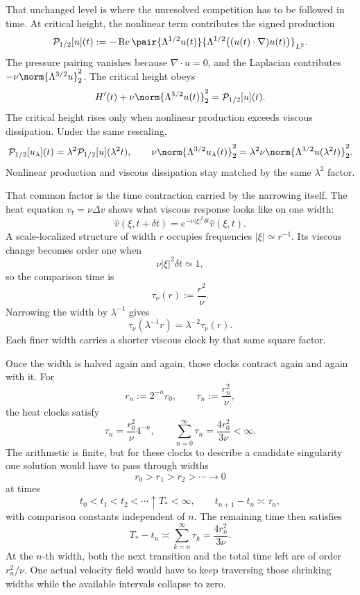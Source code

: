 
That unchanged level is where the unresolved competition has to be followed in time. At critical height, the nonlinear term contributes the signed production
\[
  \mathcal P_{1/2}[u](t)
  :=
  -\operatorname{Re}
  \pair
    {\Lambda^{1/2}u(t)}
    {\Lambda^{1/2}\bigl((u(t)\cdot\nabla)u(t)\bigr)}_{L^2}.
\]
The pressure pairing vanishes because \(\nabla\cdot u=0\), and the Laplacian contributes \(-\nu\norm{\Lambda^{3/2}u}_2^2\). The critical height obeys
\[
  H'(t)
  +
  \nu\norm{\Lambda^{3/2}u(t)}_2^2
  =
  \mathcal P_{1/2}[u](t).
\]
The critical height rises only when nonlinear production exceeds viscous dissipation. Under the same rescaling,
\[
  \mathcal P_{1/2}[u_\lambda](t)
  =
  \lambda^2\mathcal P_{1/2}[u](\lambda^2t),
  \qquad
  \nu\norm{\Lambda^{3/2}u_\lambda(t)}_2^2
  =
  \lambda^2\nu\norm{\Lambda^{3/2}u(\lambda^2t)}_2^2.
\]
Nonlinear production and viscous dissipation stay matched by the same \(\lambda^2\) factor.


That common factor is the time contraction carried by the narrowing itself. The heat equation \(v_t=\nu\Delta v\) shows what viscous response looks like on one width:
\[
  \widehat v(\xi,t+\delta t)
  =
  e^{-\nu|\xi|^2\delta t}\widehat v(\xi,t).
\]
A scale-localized structure of width \(r\) occupies frequencies \(|\xi|\simeq r^{-1}\). Its viscous change becomes order one when
\[
  \nu|\xi|^2\delta t\simeq1,
\]
so the comparison time is
\[
  \tau_\nu(r)
  :=
  \frac{r^2}{\nu}.
\]
Narrowing the width by \(\lambda^{-1}\) gives
\[
  \tau_\nu(\lambda^{-1}r)
  =
  \lambda^{-2}\tau_\nu(r).
\]
Each finer width carries a shorter viscous clock by that same square factor.


Once the width is halved again and again, those clocks contract again and again with it. For
\[
  r_n:=2^{-n}r_0,
  \qquad
  \tau_n:=\frac{r_n^2}{\nu},
\]
the heat clocks satisfy
\[
  \tau_n
  =
  \frac{r_0^2}{\nu}4^{-n},
  \qquad
  \sum_{n=0}^{\infty}\tau_n
  =
  \frac{4r_0^2}{3\nu}
  <
  \infty.
\]
The arithmetic is finite, but for these clocks to describe a candidate singularity one \NavierStokes{} solution would have to pass through widths
\[
  r_0>r_1>r_2>\cdots\longrightarrow0
\]
at times
\[
  t_0<t_1<t_2<\cdots\uparrow T_*<\infty,
  \qquad
  t_{n+1}-t_n\asymp\tau_n,
\]
with comparison constants independent of \(n\). The remaining time then satisfies
\[
  T_*-t_n
  \asymp
  \sum_{k=n}^{\infty}\tau_k
  =
  \frac{4r_n^2}{3\nu}.
\]
At the \(n\)-th width, both the next transition and the total time left are of order \(r_n^2/\nu\). One actual velocity field would have to keep traversing those shrinking widths while the available intervals collapse to zero.